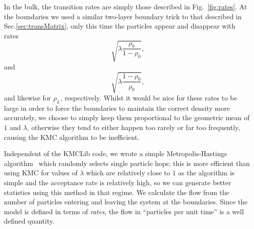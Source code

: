\documentclass[
reprint, amsmath,amssymb, aps,
 prx,
]{revtex4-1}
\begin{document}
In the bulk, the transition rates are simply
those described in Fig.~\ref{fig:rates}. At the boundaries we used a similar two-layer boundary trick to that described in Sec.\ref{sec:transMatrix}, only this time the particles appear and disappear with rates
\begin{equation}
\sqrt{\lambda\frac{\rho_0}{1-\rho_0}},
\end{equation}
and
\begin{equation}
\sqrt{\lambda\frac{1-\rho_0}{\rho_0}},
\end{equation}
and likewise for $\rho_L$, respectively. Whilst it would be nice for these rates to be large in order to force the boundaries to maintain the correct density more accurately,
we choose to simply keep them proportional to the geometric mean of $1$ and $\lambda$,
otherwise they tend to either happen too rarely or far too frequently, causing the KMC algorithm to be inefficient.


Independent of the KMCLib code, we wrote a simple Metropolis-Hastings
algorithm~\cite{metHastAlg} which randomly selects single particle hops; this is more efficient than using KMC for values of
$\lambda$ which are relatively close to $1$ as the algorithm is simple and the acceptance rate is relatively high, so we can generate better statistics using this method in that regime.
We calculate the flow from the number of particles entering and
leaving the system at the boundaries.  Since the model is defined in
terms of {\it rates}, the flow in ``particles per unit time'' is a well
defined quantity.
\end{document}
